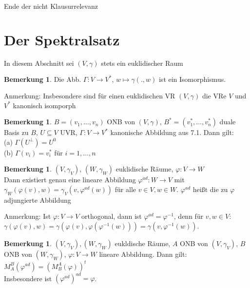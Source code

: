 \documentclass[10pt,a4paper,numbers=endperiod]{scrartcl}
\theoremstyle{definition}
\newtheorem{bem}[satz]{Bemerkung}
\begin{document}
\begin{Large}
	Ende der nicht Klausurrelevanz
\end{Large}
\newpage
\section{Der Spektralsatz}

In diesem Abschnitt sei $(V, \gamma)$ stets ein euklidischer Raum

\begin{bem}
	Die Abb. $\Gamma: V \rightarrow V^*$, $w \mapsto \gamma (.,w)$ ist ein Isomorphismus.
\end{bem}

Anmerkung: Insbesondere sind für einen euklidischen VR $(V, \gamma)$ die VRe $V$ und $V^*$ kanonisch isomporph

\begin{bem}
	$B = (v_1, \ldots, v_n)$ ONB von $(V, \gamma)$, $B^* = (v_1^*, \ldots, v_n^*)$ duale Basis zu $B$, $U \subseteq V$ UVR, $\Gamma: V \rightarrow V^*$ kanonische Abbildung aus 7.1. Dann gilt:\\
	(a) $\Gamma (U^{\perp}) = U^0$\\
	(b) $\Gamma(v_i) = v_i^*$ für $i = 1, \ldots, n$
\end{bem}

\begin{bem}
	$(V, \gamma_V)$, $(W, \gamma_W)$ euklidische Räume, $\varphi: V \rightarrow W$\\
	Dann existiert genau eine lineare Abbildung $\varphi^{ad}: W \rightarrow V$ mit $\gamma_W (\varphi (v), w) = \gamma_V (v, \varphi^{ad}(w))$ für alle $v \in V, w \in W$. $\varphi^{ad}$ heißt die zu $\varphi$ adjungierte Abbildung
\end{bem}

Anmerkung: Ist $\varphi: V \rightarrow V$ orthogonal, dann ist $\varphi^{ad} = \varphi^{-1}$, denn für $v,w \in V$:\\ $\gamma(\varphi(v), w) = \gamma(\varphi(v), \varphi(\varphi^{-1}(w))) = \gamma(v, \varphi^{-1} (w))$.

\begin{bem}
	$(V, \gamma_V), (W, \gamma_W)$ eukldische Räume, $A$ ONB von $(V, \gamma_V)$, $B$ ONB von $(W, \gamma_W)$, $\varphi: V \rightarrow W$ lineare Abbildung. Dann gilt:\\
	$M_A^B (\varphi^{ad}) = (M_B^A (\varphi))^t$\\
	Insbesondere ist $(\varphi^{ad})^{ad} = \varphi$.
\end{bem}
\end{document}
